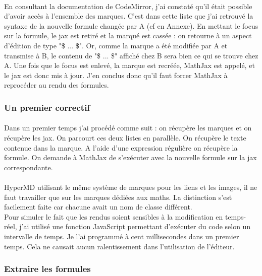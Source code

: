\documentclass[12pt]{article}
\begin{document}
\paragraph{}
En consultant la documentation de CodeMirror, j'ai constaté qu'il était possible d'avoir accès à l'ensemble des marques. C'est dans cette liste que j'ai retrouvé la syntaxe de la nouvelle formule changée par A (cf en Annexe). En mettant le focus sur la formule, le jax est retiré et la marqué est cassée : on retourne à un aspect d'édition de type "\$ ... \$". Or, comme la marque a été modifiée par A et transmise à B, le contenu de "\$ ... \$" affiché chez B sera bien ce qui se trouve chez A. Une fois que le focus est enlevé, la marque est recréée, MathJax est appelé, et le jax est donc mis à jour. J'en conclus donc qu'il faut forcer MathJax à reprocéder au rendu des formules.\\

\subsubsection{Un premier correctif}
\paragraph{}
Dans un premier temps j'ai procédé comme suit : on récupère les marques et on récupère les jax. On parcourt ces deux listes en parallèle. On récupère le texte contenue dans la marque. A l'aide d'une expression régulière on récupère la formule. On demande à MathJax de s'exécuter avec la nouvelle formule sur la jax correspondante.
\paragraph{}
HyperMD utilisant le même système de marques pour les liens et les images, il ne faut travailler que sur les marques dédiées aux maths. La distinction s'est facilement faite car chacune avait un nom de classe différent.\\
Pour simuler le fait que les rendus soient sensibles à la modification en temps-réel, j'ai utilisé une fonction JavaScript permettant d'exécuter du code selon un intervalle de temps. Je l'ai programmé à cent millisecondes dans un premier temps. Cela ne causait aucun ralentissement dans l'utilisation de l'éditeur.\\

\subsubsection{Extraire les formules}
\end{document}
